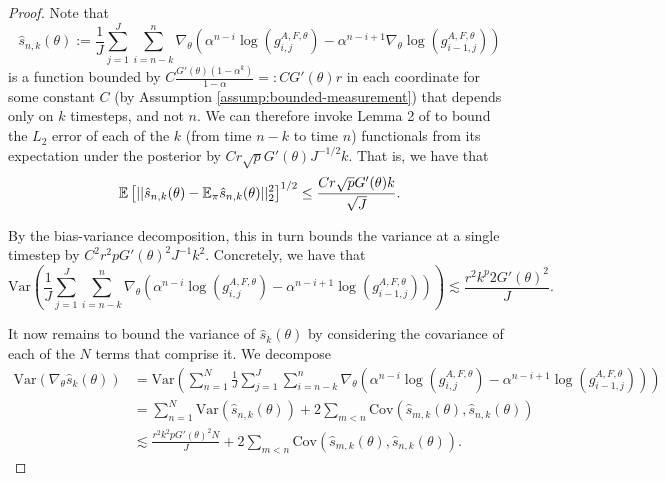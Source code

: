 \begin{proof}
Note that $$\hat s_{n,k}(\theta) := \frac{1}{J}\sum_{j=1}^J\sum_{i=n-k}^n \nabla_\theta\left(\alpha^{n-i} \log\left(g_{i,j}^{A,F,\theta}\right)- \alpha^{n-i+1} \nabla_\theta \log\left(g_{i-1,j}^{A,F,\theta}\right)\right)$$ is a function bounded by $C\frac{G'(\theta)(1-\alpha^k)}{1-\alpha} =: CG'(\theta)r$ in each coordinate for some constant $C$ (by Assumption \ref{assump:bounded-measurement}) that depends only on $k$ timesteps, and not $n$. We can therefore invoke Lemma 2 of \cite{karjalainen23} to bound the $L_2$ error of each of the $k$ (from time $n-k$ to time $n$) functionals from its expectation under the posterior by $Cr\sqrt{p}G'(\theta)J^{-1/2}k$. That is, we have that
$$\mathbb{E}\left[||\hat s_{n,k}(\theta) - \mathbb{E}_{\pi}\hat s_{n,k}(\theta)||_2^2\right]^{1/2} \leq \frac{Cr\sqrt{p}G'(\theta) k}{\sqrt{J}}.$$


By the bias-variance decomposition, this in turn bounds the variance at a single timestep by $C^2r^2pG'(\theta)^2J^{-1}k^2$. Concretely, we have that
$$\text{Var}\left(\frac{1}{J}\sum_{j=1}^J\sum_{i=n-k}^n \nabla_\theta\left(\alpha^{n-i} \log\left(g_{i,j}^{A,F,\theta}\right)- \alpha^{n-i+1} \log\left(g_{i-1,j}^{A,F,\theta}\right)\right)\right) \lesssim \frac{r^2k^p2G'(\theta)^2}{J}.$$

It now remains to bound the variance of $\hat s_k(\theta)$ by considering the covariance of each of the $N$ terms that comprise it. We decompose
\begin{align}
    \text{Var}(\nabla_\theta \hat s_k(\theta)) &= \text{Var}\left(\sum_{n=1}^N \frac{1}{J}\sum_{j=1}^J\sum_{i=n-k}^n \nabla_\theta\left(\alpha^{n-i} \log\left(g_{i,j}^{A,F,\theta}\right)- \alpha^{n-i+1} \log\left(g_{i-1,j}^{A,F,\theta}\right)\right)\right) \\
    &= \sum_{n=1}^N\text{Var}\left(\hat s_{n,k}(\theta)\right)+ 2\sum_{m<n}\text{Cov}\left(\hat s_{m,k}(\theta), \hat s_{n,k}(\theta)\right) \\
    &\lesssim \frac{r^2k^2pG'(\theta)^2N}{J} + 2\sum_{m<n}\text{Cov}\left(\hat s_{m,k}(\theta), \hat s_{n,k}(\theta)\right).
\end{align}


\end{proof}
